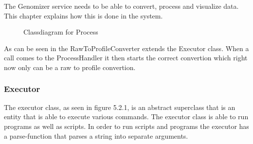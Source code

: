 The Genomizer service needs to be able to convert, process and visualize data. This chapter explains how this is done in the system.

\begin{figure}[h]
\caption{Classdiagram for Process}
\label{con_UML}
\end{figure}
	
As can be seen in  the RawToProfileConverter extends the Executor class. When a call comes to the ProcessHandler it then starts the correct convertion which right now only can be a raw to profile convertion.


\subsubsection{Executor}
The executor class, as seen in figure 5.2.1, is an abstract superclass that is an entity that is able to execute various commands. The executor class is able to run programs as well as scripts. In order to run scripts and programs the executor has a parse-function that parses a string into separate arguments. \newline

